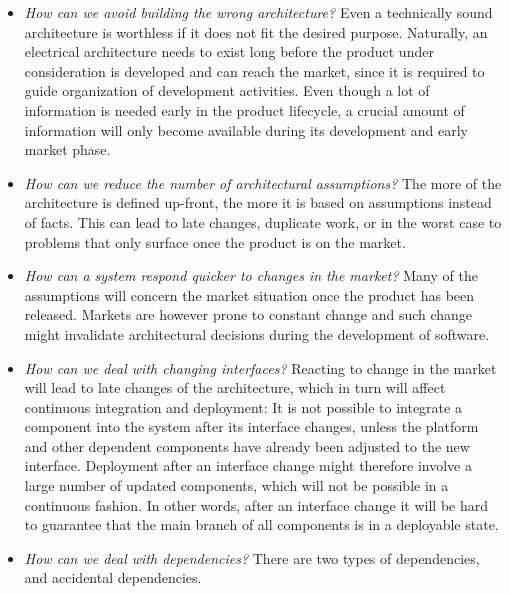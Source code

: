 \begin{itemize}
\item \emph{How can we avoid building the wrong architecture?}
{Even a technically sound architecture is worthless if it does not fit the desired purpose.
Naturally, an electrical architecture needs to exist long before the product under consideration is developed and can reach the market, since it is required to guide organization of development activities. 
Even though a lot of information is needed early in the product lifecycle, a crucial amount of information will only become available during its development and early market phase.}
\item \emph{How can we reduce the number of architectural assumptions?} The more of the architecture 
{is defined} up-front,  the more 
{it is based on}
assumptions 
{instead of facts}. 
{This can lead to late changes, duplicate work, or in the worst case to problems that only surface once the product is on the market.}
\item \emph{How can %
{a system} respond quicker to changes in the market?} 
{Many of the assumptions will concern the market situation once the product has been released. 
Markets are however prone to constant change and such change might invalidate architectural decisions during the development of software. }
\item \emph{How can we deal with changing interfaces?} {Reacting to change in the market will lead to late changes of the architecture, which in turn will affect continuous integration and deployment: It is not possible to integrate a component into the system after its interface changes, unless the platform and other dependent components have already been adjusted to the new interface.
Deployment after an interface change might therefore involve a large number of updated components, which will not be possible in a continuous fashion. 
In other words, after an interface change it will be hard to guarantee that the main branch of all components is in a deployable state.}
\item \emph{How can we deal with dependencies?}
There are two types of dependencies,   and accidental dependencies.

\end{itemize}
